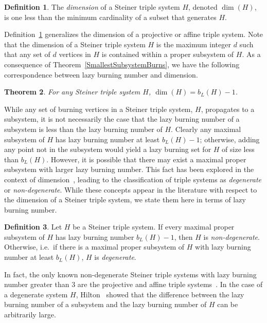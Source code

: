 \documentclass[12pt]{article}
\newtheorem{theorem}{Theorem}[section]
\theoremstyle{definition}
\newtheorem{definition}[theorem]{Definition}
\numberwithin{table}{section}
\begin{document}
\begin{definition} 
\label{def:dimension}
    The {\em dimension} of a Steiner triple system $H$, denoted $\dim(H)$, is one less than the minimum cardinality of a subset that generates $H$.
\end{definition}
Definition~\ref{def:dimension} generalizes the dimension of a projective or affine triple system.  Note that the dimension of a Steiner triple system $H$ is the maximum integer $d$ such that any set of $d$ vertices in $H$ is contained within a proper subsystem of $H$.
As a consequence of Theorem~\ref{SmallestSubsystemBurns}, we have the following correspondence between lazy burning number and dimension.
\begin{theorem}
\label{thm:dim_lazy_equiv}
    For any Steiner triple system $H$, 
   $\dim(H)=b_L(H)-1$.
\end{theorem}

While any set of burning vertices in a Steiner triple system, $H$, propagates to a subsystem, it is not necessarily the case that the lazy burning number of a subsystem is less than the lazy burning number of $H$.  Clearly any maximal subsystem of $H$ has lazy burning number at least $b_L(H)-1$; otherwise, adding any point not in the subsystem would yield a lazy burning set for $H$ of size less than $b_L(H)$.  However, it is possible that there may exist a maximal proper subsystem with larger lazy burning number.  
This fact has been explored in the context of dimension~\cite{Hilton1977}, leading to the classification of triple systems as {\em degenerate} or {\em non-degenerate}.  While these concepts appear in the literature with respect to the dimension of a Steiner triple system, we state them here in terms of lazy burning number.

\begin{definition}
Let $H$ be a Steiner triple system. If every maximal proper subsystem of $H$ has lazy burning number $b_L(H)-1$, then $H$ is {\em non-degenerate}.  Otherwise, i.e.\ if there is a maximal proper subsystem of $H$ with lazy burning number at least $b_L(H)$, $H$ is {\em degenerate}.
\end{definition}

In fact, the only known non-degenerate Steiner triple systems with lazy burning number greater than $3$ are the projective and affine triple systems~\cite{HiltonTeirlinck1980}.  In the case of a degenerate system $H$, Hilton~\cite{Hilton1977} showed that the difference between the lazy burning number of a subsystem and the lazy burning number of $H$ can be arbitrarily large.
\end{document}
